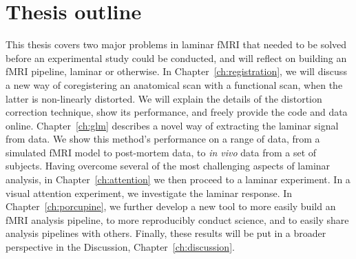 
\section*{Thesis outline}
This thesis covers two major problems in laminar fMRI that needed to be solved before an experimental study could be conducted, and will reflect on building an fMRI pipeline, laminar or otherwise. In Chapter~\ref{ch:registration}, we will discuss a new way of coregistering an anatomical scan with a functional scan, when the latter is non-linearly distorted. We will explain the details of the distortion correction technique, show its performance, and freely provide the code and data online. Chapter~\ref{ch:glm} describes a novel way of extracting the laminar signal from data. We show this method’s performance on a range of data, from a simulated fMRI model to post-mortem data, to \emph{in vivo} data from a set of subjects. Having overcome several of the most challenging aspects of laminar analysis, in Chapter~\ref{ch:attention} we then proceed to a laminar experiment. In a visual attention experiment, we investigate the laminar response. In Chapter~\ref{ch:porcupine}, we further develop a new tool to more easily build an fMRI analysis pipeline, to more reproducibly conduct science, and to easily share analysis pipelines with others. Finally, these results will be put in a broader perspective in the Discussion, Chapter~\ref{ch:discussion}.